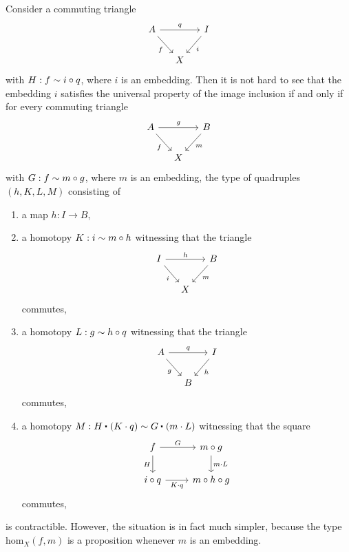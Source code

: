 \begin{rmk}
  Consider a commuting triangle
\begin{equation*}
\begin{tikzcd}[column sep=small]
A \arrow[rr,"q"] \arrow[dr,swap,"f"] & & I \arrow[dl,"i"] \\
& X
\end{tikzcd}
\end{equation*}
with $H:f\sim i\circ q$, where $i$ is an embedding. Then it is not hard to see that the embedding $i$ satisfies the universal property of the image inclusion if and only if for every commuting triangle
\begin{equation*}
  \begin{tikzcd}[column sep=small]
    A \arrow[dr,swap,"f"] \arrow[rr,"g"] & & B \arrow[dl,"m"] \\
    & X
  \end{tikzcd}
\end{equation*}
with $G:f\sim m\circ g$, where $m$ is an embedding, the type of quadruples $(h,K,L,M)$ consisting of
\begin{enumerate}
\item a map $h:I\to B$,
\item a homotopy $K:i\sim m\circ h$ witnessing that the triangle
  \begin{equation*}
    \begin{tikzcd}[column sep=small]
      I \arrow[rr,"h"] \arrow[dr,swap,"i"] & & B \arrow[dl,"m"] \\
      & X
    \end{tikzcd}
  \end{equation*}
  commutes,
\item a homotopy $L:g\sim h\circ q$ witnessing that the triangle
  \begin{equation*}
    \begin{tikzcd}[column sep=small]
      A \arrow[rr,"q"] \arrow[dr,swap,"g"] & & I \arrow[dl,"h"] \\
      & B
    \end{tikzcd}
  \end{equation*}
  commutes,
\item a homotopy $M:\ct{H}{(K\cdot q)}\htpy\ct{G}{(m\cdot L)}$ witnessing that the square
  \begin{equation*}
    \begin{tikzcd}
      f \arrow[d,swap,"H"] \arrow[r,"G"] & m\circ g \arrow[d,"m\cdot L"] \\
      i\circ q \arrow[r,swap,"K\cdot q"] & m\circ h\circ g
    \end{tikzcd}
  \end{equation*}
  commutes,
\end{enumerate}
is contractible. However, the situation is in fact much simpler, because the type $\mathrm{hom}_X(f,m)$ is a proposition whenever $m$ is an embedding.
\end{rmk}

